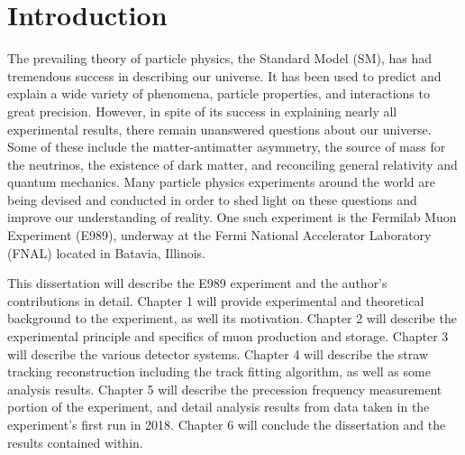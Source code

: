 
\thispagestyle{myheadings}
\graphicspath{{Body/Figures/Theory/}}

\chapter{Introduction}
\label{chapter:Introduction}

The prevailing theory of particle physics, the Standard Model (SM), has had tremendous success in describing our universe. It has been used to predict and explain a wide variety of phenomena, particle properties, and interactions to great precision. However, in spite of its success in explaining nearly all experimental results, there remain unanswered questions about our universe. Some of these include the matter-antimatter asymmetry, the source of mass for the neutrinos, the existence of dark matter, and reconciling general relativity and quantum mechanics. Many particle physics experiments around the world are being devised and conducted in order to shed light on these questions and improve our understanding of reality. One such experiment is the Fermilab Muon \gmtwo Experiment (E989), underway at the Fermi National Accelerator Laboratory (FNAL) located in Batavia, Illinois.


This dissertation will describe the E989 experiment and the author's contributions in detail. Chapter 1 will provide experimental and theoretical background to the experiment, as well its motivation. Chapter 2 will describe the experimental principle and specifics of muon production and storage. Chapter 3 will describe the various detector systems. Chapter 4 will describe the straw tracking reconstruction including the track fitting algorithm, as well as some analysis results. Chapter 5 will describe the precession frequency measurement portion of the experiment, and detail analysis results from data taken in the experiment's first run in 2018. Chapter 6 will conclude the dissertation and the results contained within.



